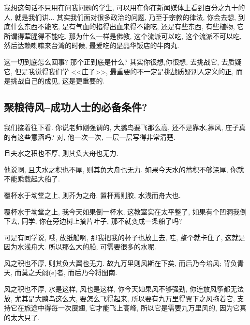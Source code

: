 \documentclass[11pt]{article}
\begin{document}
我想这句话不只用在问我问题的学生, 可以用在你在新闻媒体上看到百分之九十的人, 就是我们讲... 其实我们面对很多政治的问题, 乃至于宗教的律法, 你会去想, 到底什么东西不能吃, 是有气血的掐得出血来得不能吃, 还是有些东西, 有些植物, 它所谓得荤腥得不能吃, 那为什么一样是佛教, 这个流派可以吃, 这个流派不可以吃, 然后达赖喇嘛来台湾的时候, 最爱吃的是晶华饭店的牛肉丸. 

这一切到底怎么回事? 那个正到底是什么? 其实你很想,你很想, 去挑战它, 去质疑它, 但是我觉得我们学 <<庄子>>, 最重要的不一定是挑战质疑别人定义的正, 而是挑战自己的成见, 这是更重要的.

\subsection{\kaishu 聚粮待风--成功人士的必备条件?}

我们接着往下看. 你说老师刚强调的, 大鹏鸟要飞那么高, 还不是靠水,靠风, 庄子真的有这些意涵吗? 对, 他一次一次, 一层一层写得非常清楚. 

\begin{center}
	{\color{magenta} 且夫水之积也不厚, 则其负大舟也无力.}
\end{center}

\vspace{-0.5cm}

他说啊, {\color{blue} 且夫水之积也不厚, 则其负大舟也无力.} 如果今天水的蓄积不够深厚, 你就不能乘载起大船了.

\begin{center}
	{\color{magenta} 覆杯水于坳堂之上, 则芥为之舟. 置杯焉则胶, 水浅而舟大也.}
\end{center}

\vspace{-0.5cm}

{\color{blue} 覆杯水于坳堂之上}, 我今天如果倒一杯水, 这教室实在太平整了, 如果有个凹洞我倒下去, 同学, 你在旁边树上摘片叶子, 那不就变成一条船了吗? 

可是有同学说, 哦, 放纸船啊, 那我把我的杯子也放上去, 哇, 整个就卡住了, 这就是因为水浅舟大. 所以那么大的船, 可需要很多的水呢. 

\begin{center}
	{\color{magenta} 风之积也不厚, 则其负大翼也无力. 故九万里则风斯在下矣, 而后乃今培风; 背负青天, 而莫之夭阏(e)者, 而后乃今将图南. }
\end{center}

\vspace{-0.5cm}

{\color{blue} 风之积也不厚}, 水是这样, 风也是这样, 你今天如果风不够强劲, 你连放风筝都无法放, 尤其是大鹏鸟这么大, 要怎么飞得起来, 所以要有九万里得翼下之风拖着它, 支持它在旅途中得每一次展翅, 它才能飞上高峰, 所以它是需要九万里风的, 因为它真的太大只了.
\end{document}

